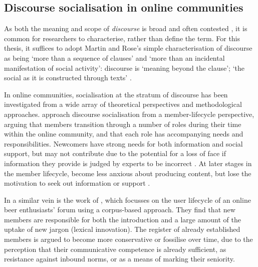 \subsection{Discourse socialisation in online communities}

As both the meaning and scope of \emph{discourse} is broad and often contested \cite{gee_discourse_2004,gee_introduction_2013}, it is common for researchers to characterise, rather than define the term. For this thesis, it suffices to adopt Martin and Rose's simple characterisation of discourse as being `more than a sequence of clauses' and `more than an incidental manifestation of social activity': discourse is `meaning beyond the clause'; `the social as it is constructed through texts' \parencite*[p.~1]{martin_working_2003}.

In online communities, socialisation at the stratum of discourse has been investigated from a wide array of theoretical perspectives and methodological approaches. \textcite{lee_new_2014} approach discourse socialisation from a member\hyp{}lifecycle perspective, arguing that \glspl{member} transition through a number of roles during their time within the online community, and that each role has accompanying needs and responsibilities. Newcomers have strong needs for both information and social support, but may not contribute due to the potential for a loss of face if information they provide is judged by experts to be incorrect \cite{fuller_innovation_2007}. At later stages in the member lifecycle,  become less anxious about producing content, but lose the motivation to seek out information or support \cite{lee_new_2014}. %

In a similar vein is the work of \textcite{danescu-niculescu-mizil_no_2013}, which focusses on the user lifecycle of an online beer enthusiasts' \gls{forum} using a corpus\hyp{}based approach. They find that new \glspl{member} are responsible for both the introduction and a large amount of the uptake of new jargon (lexical innovation). The register of already established \glspl{member} is argued to become more conservative or fossilise over time, due to the perception that their communicative competence is already sufficient, as resistance against inbound norms, or as a means of marking their seniority.

